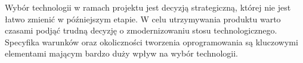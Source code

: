 Wybór technologii w ramach projektu jest decyzją strategiczną, której nie jest łatwo zmienić w późniejszym etapie.
W celu utrzymywania produktu warto czasami podjąć trudną decyzję o zmodernizowaniu stosu technologicznego.
Specyfika warunków oraz okoliczności tworzenia oprogramowania są kluczowymi elementami mającym bardzo duży wpływ na wybór technologii.